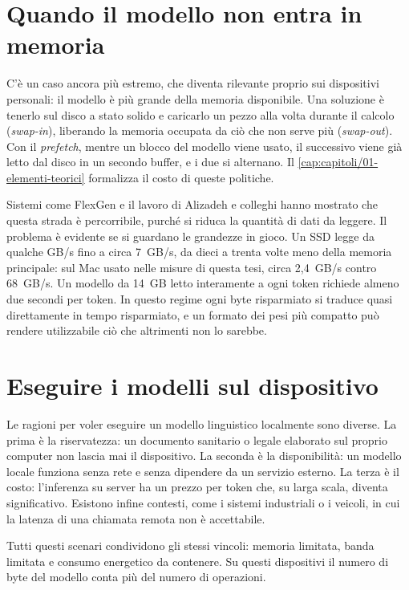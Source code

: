 \section{Quando il modello non entra in memoria}

C'è un caso ancora più estremo, che diventa rilevante proprio sui dispositivi personali: il modello è più grande della memoria disponibile. Una soluzione è tenerlo sul disco a stato solido e caricarlo un pezzo alla volta durante il calcolo (\emph{swap-in}), liberando la memoria occupata da ciò che non serve più (\emph{swap-out}). Con il \emph{prefetch}, mentre un blocco del modello viene usato, il successivo viene già letto dal disco in un secondo buffer, e i due si alternano. Il \autoref{cap:capitoli/01-elementi-teorici} formalizza il costo di queste politiche.

Sistemi come FlexGen \cite{sheng2023flexgen} e il lavoro di Alizadeh e colleghi \cite{alizadeh2024llm} hanno mostrato che questa strada è percorribile, purché si riduca la quantità di dati da leggere. Il problema è evidente se si guardano le grandezze in gioco. Un SSD legge da qualche GB/s fino a circa 7~GB/s, da dieci a trenta volte meno della memoria principale: sul Mac usato nelle misure di questa tesi, circa 2,4~GB/s contro 68~GB/s. Un modello da 14~GB letto interamente a ogni token richiede almeno due secondi per token. In questo regime ogni byte risparmiato si traduce quasi direttamente in tempo risparmiato, e un formato dei pesi più compatto può rendere utilizzabile ciò che altrimenti non lo sarebbe.

\section{Eseguire i modelli sul dispositivo}

Le ragioni per voler eseguire un modello linguistico localmente sono diverse. La prima è la riservatezza: un documento sanitario o legale elaborato sul proprio computer non lascia mai il dispositivo. La seconda è la disponibilità: un modello locale funziona senza rete e senza dipendere da un servizio esterno. La terza è il costo: l'inferenza su server ha un prezzo per token che, su larga scala, diventa significativo. Esistono infine contesti, come i sistemi industriali o i veicoli, in cui la latenza di una chiamata remota non è accettabile.

Tutti questi scenari condividono gli stessi vincoli: memoria limitata, banda limitata e consumo energetico da contenere. Su questi dispositivi il numero di byte del modello conta più del numero di operazioni.

